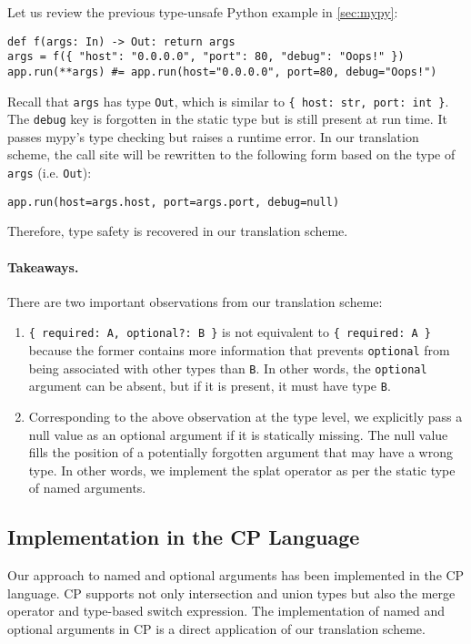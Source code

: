 Let us review the previous type-unsafe Python example in \autoref{sec:mypy}:
\begin{lstlisting}[language={[3]Python}]
def f(args: In) -> Out: return args
args = f({ "host": "0.0.0.0", "port": 80, "debug": "Oops!" })
app.run(**args) #= app.run(host="0.0.0.0", port=80, debug="Oops!")
\end{lstlisting}
Recall that \lstinline{args} has type \lstinline{Out}, which is similar to
\lstinline[language={[3]Python}]|{ host: str, port: int }|. The \lstinline{debug} key is forgotten in
the static type but is still present at run time. It passes mypy's type checking
but raises a runtime error. In our translation scheme, the call site will be
rewritten to the following form based on the type of \lstinline{args} (i.e.
\lstinline{Out}):
\begin{lstlisting}
app.run(host=args.host, port=args.port, debug=null)
\end{lstlisting}
Therefore, type safety is recovered in our translation scheme.

\paragraph{Takeaways.}
There are two important observations from our translation scheme:
\begin{enumerate}
\item \lstinline|{ required: A, optional?: B }| is not equivalent to
      \lstinline|{ required: A }| because the former contains more information
      that prevents \lstinline{optional} from being associated with other types
      than \lstinline{B}. In other words, the \lstinline{optional} argument can
      be absent, but if it is present, it must have type \lstinline{B}.
\item Corresponding to the above observation at the type level, we explicitly
      pass a null value as an optional argument if it is statically missing. The
      null value fills the position of a potentially forgotten argument that may
      have a wrong type. In other words, we implement the splat operator as per
      the static type of named arguments.
\end{enumerate}

\subsection{Implementation in the CP Language}

Our approach to named and optional arguments has been implemented in the CP
language. CP supports not only intersection and union types but also the merge
operator and type-based switch expression. The implementation of named and
optional arguments in CP is a direct application of our translation scheme.

